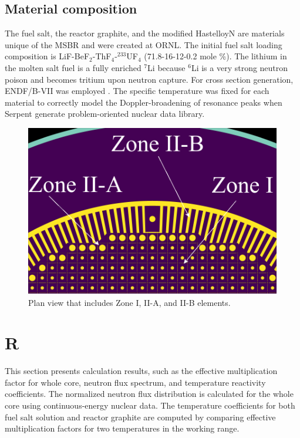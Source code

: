 \documentclass{anstrans}
\begin{document}
\subsection{Material composition}
The fuel salt, the reactor graphite, and the modified HastelloyN are materials 
unique of the \gls{MSBR} and were created at \gls{ORNL}. The initial fuel salt 
loading composition is LiF-BeF$_2$-ThF$_4$-$^{233}$UF$_4$ (71.8-16-12-0.2 mole 
\%). The lithium in the molten salt fuel is a fully enriched $^{7}$Li because 
$^{6}$Li is a very strong neutron poison and becomes tritium upon neutron 
capture. For cross section generation, ENDF/B-VII was employed 
\cite{chadwick_endf/b-vii.0:_2006}. The specific temperature was fixed for each 
material to correctly model the Doppler-broadening of resonance peaks when 
Serpent generate problem-oriented nuclear data library.
\begin{figure}[htbp!] %
  \centering
  \includegraphics[width=0.96\linewidth]{figure_2_5.png}
  \caption{Plan view that includes Zone I, II-A, and II-B elements.}
  \label{fig:zone2B}
\end{figure}
\FloatBarrier
\section{R}
This section presents calculation results, such as the effective multiplication 
factor for whole core, neutron flux spectrum, and temperature reactivity 
coefficients. The normalized neutron flux distribution is calculated for the 
whole core using continuous-energy nuclear data.
The temperature coefficients for both fuel salt solution and reactor graphite 
are computed by comparing effective multiplication factors for two temperatures 
in the working range.
 	
\end{document}
